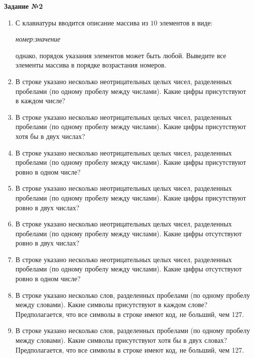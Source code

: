 \textbf{Задание №2} %

\begin{enumerate}
\item С клавиатуры вводится описание массива из $10$ элементов в виде:

\textit{номер}:\textit{значение}

однако, порядок указания элементов может быть любой. Выведите все элементы
массива в порядке возрастания номеров.

\item В строке указано несколько неотрицательных целых чисел, разделенных пробелами (по одному
пробелу между числами). Какие цифры присутствуют в каждом числе?

\item В строке указано несколько неотрицательных целых чисел, разделенных пробелами (по одному
пробелу между числами). Какие цифры присутствуют хотя бы в двух числах?

\item В строке указано несколько неотрицательных целых чисел, разделенных пробелами (по одному
пробелу между числами). Какие цифры присутствуют ровно в одном числе?

\item В строке указано несколько неотрицательных целых чисел, разделенных пробелами (по одному
пробелу между числами). Какие цифры присутствуют ровно в двух числах?

\item В строке указано несколько неотрицательных целых чисел, разделенных пробелами (по одному
пробелу между числами). Какие цифры отсутствуют ровно в двух числах?

\item В строке указано несколько неотрицательных целых чисел, разделенных пробелами (по одному
пробелу между числами). Какие цифры отсутствуют ровно в одном числе?



\item В строке указано несколько слов, разделенных пробелами (по одному
пробелу между словами). Какие символы присутствуют в каждом слове? 
Предполагается, что все символы в строке имеют код, не больший, чем 127.

\item В строке указано несколько слов, разделенных пробелами (по одному
пробелу между словами). Какие символы присутствуют хотя бы в двух словах?
Предполагается, что все символы в строке имеют код, не больший, чем 127.



\end{enumerate}
